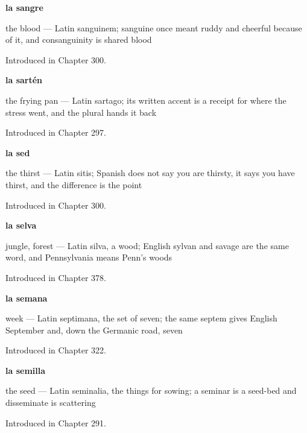 \noindent\begin{minipage}[t]{\linewidth}
\raggedright
\textbf{la sangre}\par
\small the blood — Latin sanguinem; sanguine once meant ruddy and cheerful because of it, and consanguinity is shared blood\par
\footnotesize Introduced in Chapter 300.
\end{minipage}\par\medskip

\noindent\begin{minipage}[t]{\linewidth}
\raggedright
\textbf{la sartén}\par
\small the frying pan — Latin sartago; its written accent is a receipt for where the stress went, and the plural hands it back\par
\footnotesize Introduced in Chapter 297.
\end{minipage}\par\medskip

\noindent\begin{minipage}[t]{\linewidth}
\raggedright
\textbf{la sed}\par
\small the thirst — Latin sitis; Spanish does not say you are thirsty, it says you have thirst, and the difference is the point\par
\footnotesize Introduced in Chapter 300.
\end{minipage}\par\medskip

\noindent\begin{minipage}[t]{\linewidth}
\raggedright
\textbf{la selva}\par
\small jungle, forest — Latin silva, a wood; English sylvan and savage are the same word, and Pennsylvania means Penn's woods\par
\footnotesize Introduced in Chapter 378.
\end{minipage}\par\medskip

\noindent\begin{minipage}[t]{\linewidth}
\raggedright
\textbf{la semana}\par
\small week — Latin septimana, the set of seven; the same septem gives English September and, down the Germanic road, seven\par
\footnotesize Introduced in Chapter 322.
\end{minipage}\par\medskip

\noindent\begin{minipage}[t]{\linewidth}
\raggedright
\textbf{la semilla}\par
\small the seed — Latin seminalia, the things for sowing; a seminar is a seed-bed and disseminate is scattering\par
\footnotesize Introduced in Chapter 291.
\end{minipage}\par\medskip

